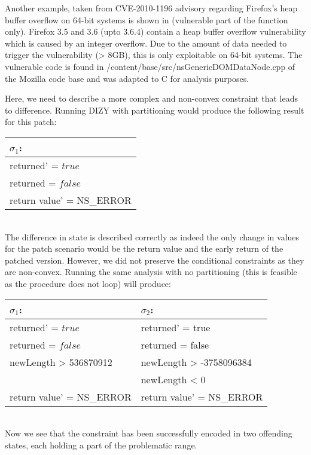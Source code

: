 Another example, taken from CVE-2010-1196 advisory regarding Firefox's heap buffer overflow on 64-bit systems is shown in  (vulnerable part of the function only). Firefox 3.5 and 3.6 (upto 3.6.4) contain a heap buffer overflow vulnerability which is caused by an integer overflow. Due to the amount of data needed to trigger the vulnerability (> 8GB), this is only exploitable on 64-bit systems. The vulnerable code is found in /content/base/src/nsGenericDOMDataNode.cpp
of the Mozilla code base and was adapted to C for analysis purposes.



Here, we need to describe a more complex and non-convex constraint that leads to difference. Running DIZY with partitioning would produce the following result for this patch:
\\
\begin{tabular}{l}
$\sigma_1$:
\\ \hline
returned' = $true$
\\
returned = $false$
\\
return value' = NS\_ERROR
\\ \hline
\end{tabular}
\\
The difference in state is described correctly as indeed the only change in values for the patch scenario would be the return value and the early return of the patched version. However, we did not preserve the conditional constraints as they are non-convex. Running the same analysis with no partitioning (this is feasible as the procedure does not loop) will produce:
\\
\begin{tabular}{l|l}
$\sigma_1$:                                         & $\sigma_2$:
\\ \hline
returned' = $true$                                  & returned' = true
\\
returned = $false$                                  & returned = false
\\
newLength > 536870912                               & newLength > -3758096384
\\
                                                    & newLength < 0
\\
return value' = NS\_ERROR                           & return value' = NS\_ERROR
\\ \hline
\end{tabular}
\\
Now we see that the  constraint has been successfully encoded in two offending states, each holding a part of the problematic range.


